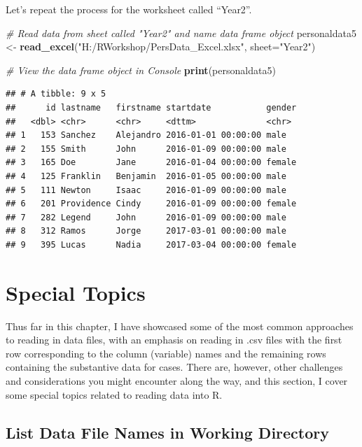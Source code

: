 \documentclass[]{book}
\newenvironment{Shaded}{\begin{snugshade}}{\end{snugshade}}
\newcommand{\KeywordTok}[1]{\textcolor[rgb]{0.13,0.29,0.53}{\textbf{#1}}}
\newcommand{\DataTypeTok}[1]{\textcolor[rgb]{0.13,0.29,0.53}{#1}}
\newcommand{\StringTok}[1]{\textcolor[rgb]{0.31,0.60,0.02}{#1}}
\newcommand{\CommentTok}[1]{\textcolor[rgb]{0.56,0.35,0.01}{\textit{#1}}}
\newcommand{\NormalTok}[1]{#1}
\begin{document}
Let's repeat the process for the worksheet called ``Year2''.

\begin{Shaded}
\begin{Highlighting}[]
\CommentTok{# Read data from sheet called "Year2" and name data frame object}
\NormalTok{personaldata5 <-}\StringTok{ }\KeywordTok{read_excel}\NormalTok{(}\StringTok{"H:/RWorkshop/PersData_Excel.xlsx"}\NormalTok{, }\DataTypeTok{sheet=}\StringTok{"Year2"}\NormalTok{)}
\end{Highlighting}
\end{Shaded}

\begin{Shaded}
\begin{Highlighting}[]
\CommentTok{# View the data frame object in Console}
\KeywordTok{print}\NormalTok{(personaldata5)}
\end{Highlighting}
\end{Shaded}

\begin{verbatim}
## # A tibble: 9 x 5
##      id lastname   firstname startdate           gender
##   <dbl> <chr>      <chr>     <dttm>              <chr> 
## 1   153 Sanchez    Alejandro 2016-01-01 00:00:00 male  
## 2   155 Smith      John      2016-01-09 00:00:00 male  
## 3   165 Doe        Jane      2016-01-04 00:00:00 female
## 4   125 Franklin   Benjamin  2016-01-05 00:00:00 male  
## 5   111 Newton     Isaac     2016-01-09 00:00:00 male  
## 6   201 Providence Cindy     2016-01-09 00:00:00 female
## 7   282 Legend     John      2016-01-09 00:00:00 male  
## 8   312 Ramos      Jorge     2017-03-01 00:00:00 male  
## 9   395 Lucas      Nadia     2017-03-04 00:00:00 female
\end{verbatim}

\section{Special Topics}\label{special-topics}

Thus far in this chapter, I have showcased some of the most common
approaches to reading in data files, with an emphasis on reading in .csv
files with the first row corresponding to the column (variable) names
and the remaining rows containing the substantive data for cases. There
are, however, other challenges and considerations you might encounter
along the way, and this section, I cover some special topics related to
reading data into R.

\subsection{List Data File Names in Working
Directory}\label{list-data-file-names-in-working-directory}
\end{document}
